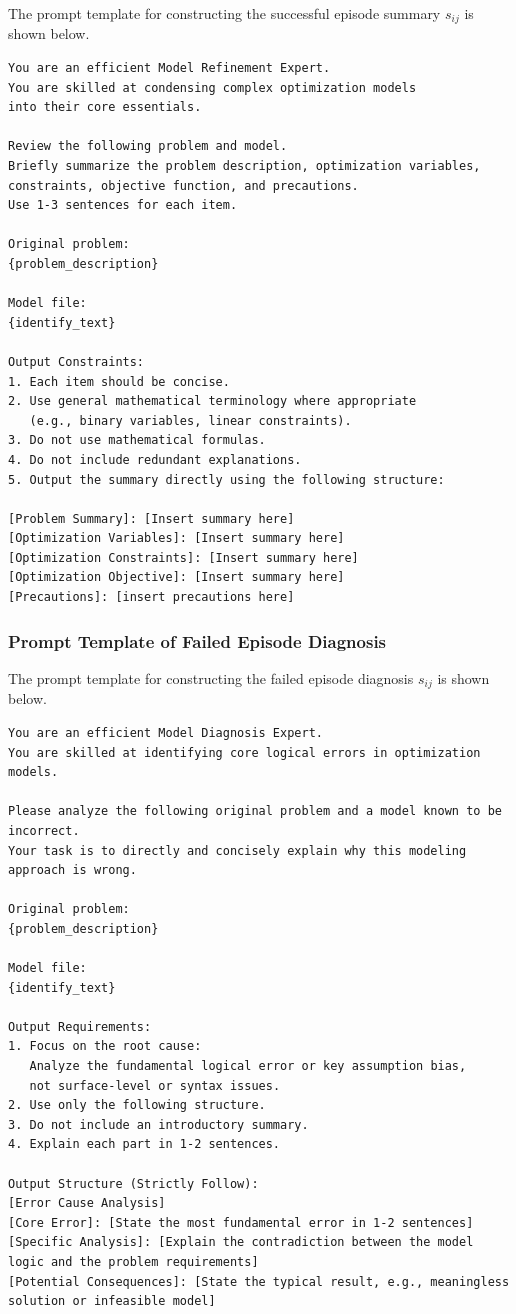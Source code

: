 \documentclass[letterpaper,onecolumn,12pt]{IEEEtran}
\begin{document}
The prompt template for constructing the successful episode summary \(s_{ij}\)
is shown below.
\begin{lstlisting}[style=promptstyle]
You are an efficient Model Refinement Expert.
You are skilled at condensing complex optimization models
into their core essentials.

Review the following problem and model.
Briefly summarize the problem description, optimization variables,
constraints, objective function, and precautions.
Use 1-3 sentences for each item.

Original problem:
{problem_description}

Model file:
{identify_text}

Output Constraints:
1. Each item should be concise.
2. Use general mathematical terminology where appropriate
   (e.g., binary variables, linear constraints).
3. Do not use mathematical formulas.
4. Do not include redundant explanations.
5. Output the summary directly using the following structure:

[Problem Summary]: [Insert summary here]
[Optimization Variables]: [Insert summary here]
[Optimization Constraints]: [Insert summary here]
[Optimization Objective]: [Insert summary here]
[Precautions]: [insert precautions here]
\end{lstlisting}

\subsubsection{Prompt Template of Failed Episode Diagnosis}
\label{app:prompt_failure_diagnosis}

The prompt template for constructing the failed episode diagnosis \(s_{ij}\)
is shown below.
\begin{lstlisting}[style=promptstyle]
You are an efficient Model Diagnosis Expert.
You are skilled at identifying core logical errors in optimization models.

Please analyze the following original problem and a model known to be incorrect.
Your task is to directly and concisely explain why this modeling approach is wrong.

Original problem:
{problem_description}

Model file:
{identify_text}

Output Requirements:
1. Focus on the root cause:
   Analyze the fundamental logical error or key assumption bias,
   not surface-level or syntax issues.
2. Use only the following structure.
3. Do not include an introductory summary.
4. Explain each part in 1-2 sentences.

Output Structure (Strictly Follow):
[Error Cause Analysis]
[Core Error]: [State the most fundamental error in 1-2 sentences]
[Specific Analysis]: [Explain the contradiction between the model logic and the problem requirements]
[Potential Consequences]: [State the typical result, e.g., meaningless solution or infeasible model]
\end{lstlisting}
\end{document}
